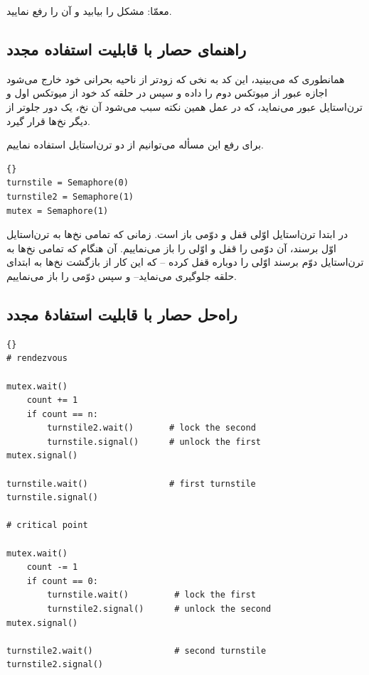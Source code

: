 \documentclass{book}
\newcommand{\clearemptydoublepage}{}%
\begin{document}
    معمّا: مشکل را بیابید و آن را رفع نمایید. 


\clearemptydoublepage
\subsection {راهنمای حصار با قابلیت استفاده مجدد}

    همانطوری که می‌بینید،
    این کد به نخی که زودتر از ناحیه بحرانی خود خارج می‌شود اجازه عبور از میوتکس دوم را داده و سپس در حلقه کد خود از  میوتکس 
    اول و ترن‌استایل عبور می‌نماید، که در عمل همین نکته سبب می‌شود آن نخ، یک دور جلوتر از دیگر نخ‌ها قرار گیرد. 

    برای رفع این مسأله می‌توانیم از دو ترن‌استایل استفاده نماییم. 


\begin{latin}
\begin{lstlisting}[title=\rl{ راهنمای حصار با قابلیت استفاده مجدد}]{} 
turnstile = Semaphore(0)
turnstile2 = Semaphore(1)
mutex = Semaphore(1)
\end{lstlisting}
\end{latin}

    در ابتدا ترن‌استایل اوّلی قفل و دوّمی باز است. زمانی که تمامی نخ‌ها به ترن‌استایل اوّل برسند، آن دوّمی را قفل  و اوّلی را باز می‌نماییم. 
    آن هنگام که تمامی نخ‌ها به ترن‌استایل دوّم برسند اوّلی را دوباره قفل کرده --%
    که این کار از بازگشت نخ‌ها به ابتدای حلقه جلوگیری می‌نماید--
    و سپس دوّمی را باز می‌نماییم.


\clearemptydoublepage
\subsection {   راه‌حل حصار با قابلیت استفادهٔ مجدد}


\begin{latin}
\begin{lstlisting}[title=\rl{ راهنمای حصار با قابلیت استفادهٔ مجدد}]{} 
# rendezvous

mutex.wait()
    count += 1
    if count == n:
        turnstile2.wait()       # lock the second
        turnstile.signal()      # unlock the first
mutex.signal()

turnstile.wait()                # first turnstile
turnstile.signal()

# critical point

mutex.wait()
    count -= 1
    if count == 0: 
        turnstile.wait()         # lock the first
        turnstile2.signal()      # unlock the second
mutex.signal()

turnstile2.wait()                # second turnstile
turnstile2.signal()
\end{lstlisting}
\end{latin}
\end{document}
